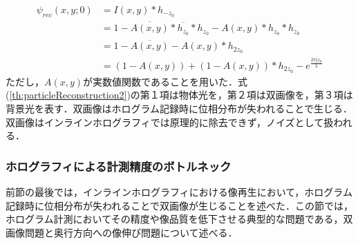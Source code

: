 \begin{align}
    \label{th:particleReconstruction}
    \psi_{rec}(x,y;0) &= I(x,y) * h_{-z_0} \\
    &= 1 - \overline{A(x,y)}*\overline{h_{z_0}}*h_{z_0} - A(x,y)*h_{z_0}*h_{z_0} \\
    &= 1 - \overline{A(x,y)} - A(x,y)*h_{2z_0} \\
    \label{th:particleReconstruction2}
    &= \left( 1 - A(x,y) \right) + (1 - A(x,y))*h_{2z_0} - e^{\frac{2\pi \mathrm{j}z_0}{\lambda}}
\end{align}
ただし，$A(x,y)$が実数値関数であることを用いた．式(\ref{th:particleReconstruction2})の第１項は物体光を，第２項は双画像を，第３項は背景光を表す．双画像はホログラム記録時に位相分布が失われることで生じる．双画像はインラインホログラフィでは原理的に除去できず，ノイズとして扱われる．

\subsubsection{ホログラフィによる計測精度のボトルネック}\label{sec:holographyBottleNeck}
前節の最後では，インラインホログラフィにおける像再生において，ホログラム記録時に位相分布が失われることで双画像が生じることを述べた．この節では，ホログラム計測においてその精度や像品質を低下させる典型的な問題である，双画像問題\cite{kats2010}と奥行方向への像伸び問題\cite{meng1995}について述べる．

